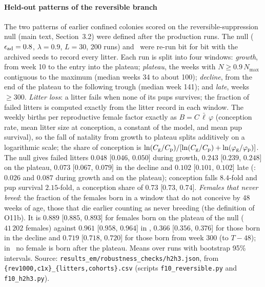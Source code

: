 \paragraph{Held-out patterns of the reversible branch}
The two patterns of earlier confined colonies scored on the reversible-suppression null (main text, Section~3.2) were
defined after the production runs. The null ($\epsilon_{\rm ad}=0.8$, $\lambda=0.9$, $L=30$, 200 runs) and \Cone\ were re-run
bit for bit with the archived seeds to record every litter. Each run is split into four windows: \emph{growth}, from
week 10 to the entry into the plateau; \emph{plateau}, the weeks with $N\ge0.9\,N_{\max}$ contiguous to the maximum
(median weeks 34 to about 100); \emph{decline}, from the end of the plateau to the following trough (median week
141); and \emph{late}, weeks $\ge300$. \emph{Litter loss}: a litter fails when none of its pups survives; the
fraction of failed litters is computed exactly from the litter record in each window. The weekly births per
reproductive female factor exactly as $B=C\,\bar\ell\,\varphi$ (conception rate, mean litter size at conception, a constant of the model, and
mean pup survival), so the fall of natality from growth to plateau splits additively on a logarithmic scale; the share of
conception is $\ln(C_{\rm g}/C_{\rm p})/[\ln(C_{\rm g}/C_{\rm p})+\ln(\varphi_{\rm g}/\varphi_{\rm p})]$. The null gives failed litters $0.048$ [$0.046$, $0.050$] during growth, $0.243$ [$0.239$, $0.248$] on
the plateau, $0.073$ [$0.067$, $0.079$] in the decline and $0.102$ [$0.101$, $0.102$] late (\Cone: $0.026$ and $0.087$
during growth and on the plateau); conception falls $8.4$-fold and pup survival $2.15$-fold, a conception share of
$0.73$ [$0.73$, $0.74$]. \emph{Females that never breed}: the fraction of the females born in a window that do not
conceive by 48 weeks of age, those that die earlier counting as never breeding (the definition of O11b). It is
$0.889$ [$0.885$, $0.893$] for females born on the plateau of the null ($41\,202$ females) against $0.961$ [$0.958$,
$0.964$] in \Cone, $0.366$ [$0.356$, $0.376$] for those born in the decline and $0.719$ [$0.718$, $0.720$] for those born
from week 300 (to $T-48$); in \Cone\ no female is born after the plateau. Means over runs with bootstrap 95\%
intervals. Source: \texttt{results\_em/robustness\_checks/h2h3.json}, from
\texttt{\{rev1000,c1x\}\_\{litters,cohorts\}.csv} (scripts \texttt{f10\_reversible.py} and \texttt{f10\_h2h3.py}).

